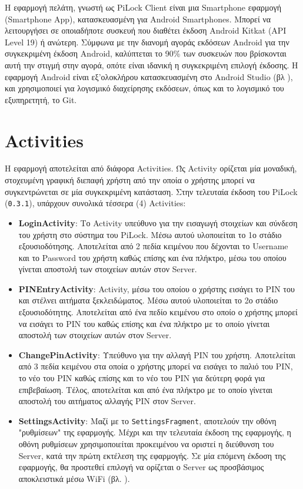 Η εφαρμογή πελάτη, γνωστή ως PiLock Client είναι μια Smartphone εφαρμογή (Smartphone App), κατασκευασμένη για Android Smartphones. Μπορεί να λειτουργήσει σε οποιαδήποτε συσκευή που διαθέτει έκδοση Android Kitkat (API Level 19) ή ανώτερη. Σύμφωνα με την διανομή αγοράς εκδόσεων Android για την συγκεκριμένη έκδοση Android, καλύπτεται το 90\% των συσκευών που βρίσκονται αυτή την στιγμή στην αγορά, οπότε είναι ιδανική η συγκεκριμένη επιλογή έκδοσης. Η εφαρμογή Android είναι εξ'ολοκλήρου κατασκευασμένη στο Android Studio (βλ ), και χρησιμοποιεί για λογισμικό διαχείρησης εκδόσεων, όπως και το λογισμικό του εξυπηρετητή, το Git.

\section{Activities}
	Η εφαρμογή αποτελείται από διάφορα Activities. Ώς Activity ορίζεται μία μοναδική, στοχευμένη γραφική διεπαφή χρήστη από την οποία ο χρήστης μπορεί να συγκεντρώνεται σε μία συγκεκριμένη κατάσταση. Στην τελευταία έκδοση του PiLock (\verb|0.3.1|), υπάρχουν συνολικά τέσσερα (4) Activities:

	\begin{itemize}
		\item \textbf{LoginActivity}: Το Activity υπεύθυνο για την εισαγωγή στοιχείων και σύνδεση του χρήστη στο σύστημα του PiLock. Μέσω αυτού υλοποιείται το 1ο στάδιο εξουσιοδότησης. Αποτελείται από 2 πεδία κειμένου που δέχονται το Username και το Password του χρήστη καθώς επίσης και ένα πλήκτρο, μέσω του οποίου γίνεται αποστολή των στοιχείων αυτών στον Server.
		\item \textbf{PINEntryActivity}: Activity, μέσω του οποίου ο χρήστης εισάγει το PIN του και στέλνει αιτήματα ξεκλειδώματος. Μέσω αυτού υλοποιείται το 2ο στάδιο εξουσιοδότητης. Αποτελείται από ένα πεδίο κειμένου στο οποίο ο χρήστης μπορεί να εισάγει το PIN του καθώς επίσης και ένα πλήκτρο με το οποίο γίνεται αποστολή των στοιχείων αυτών στον Server.
		\item \textbf{ChangePinActivity}: Υπεύθυνο για την αλλαγή PIN του χρήστη. Αποτελείται από 3 πεδία κειμένου στα οποία ο χρήστης μπορεί να εισάγει το παλιό του PIN, το νέο του PIN καθώς επίσης και το νέο του PIN για δεύτερη φορά για επιβεβαίωση. Τέλος, αποτελείται και από ένα πλήκτρο με το οποίο γίνεται αποστολή του αιτήματος αλλαγής PIN στον Server.
		\item \textbf{SettingsActivity}: Μαζί με το \verb|SettingsFragment|, αποτελούν την οθόνη "ρυθμίσεων" της εφαρμογής. Μέχρι και την τελευταία έκδοση της εφαρμογής, η οθόνη ρυθμίσεων χρησιμοποιείται προκειμένου να οριστεί η διεύθυνση του Server, κατά την πρώτη εκτέλεση της εφαρμογής. Σε μία επόμενη έκδοση της εφαρμογής, θα προστεθεί επιλογή να ορίζεται ο Server ως προσβάσιμος αποκλειστικά μέσω WiFi (βλ. ).
	\end{itemize}

